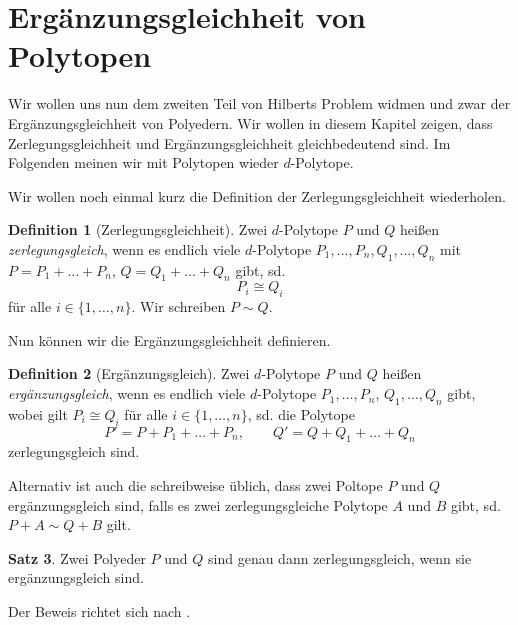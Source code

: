 \documentclass[11pt,titlepage]{article}
\theoremstyle{definition}
\newtheorem{theorem}{Satz}[section]
\newtheorem{definition}[theorem]{Definition}
\theoremstyle{remark}
\begin{document}
	\section{Ergänzungsgleichheit von Polytopen}
	
	Wir wollen uns nun dem zweiten Teil von Hilberts Problem widmen und zwar der 
	Ergänzungsgleichheit von Polyedern. Wir wollen in diesem Kapitel zeigen, dass 
	Zerlegungsgleichheit und Ergänzungsgleichheit gleichbedeutend sind. 
	Im Folgenden meinen wir mit Polytopen wieder $d$-Polytope.
	
	Wir wollen noch einmal kurz die Definition der Zerlegungsgleichheit wiederholen.
	
	\begin{definition}[Zerlegungsgleichheit]
		Zwei $d$-Polytope $P$ und $Q$ heißen \textsl{zerlegungsgleich}, wenn es endlich viele $d$-Polytope 
		$P_1,\ldots,P_n,Q_1,\ldots,Q_n$ mit $P=P_1 +\ldots +P_n$,  $Q=Q_1 +\ldots+Q_n$ 
		gibt, sd. 
		\[P_i\cong Q_i\]
		für alle $i\in\{1,\ldots,n\}$. Wir schreiben $P\sim Q$.
	\end{definition}
	
	Nun können wir die Ergänzungsgleichheit definieren.
	
	\begin{definition}[Ergänzungsgleich]
		Zwei $d$-Polytope $P$ und $Q$ heißen \textsl{ergänzungsgleich}, wenn es endlich viele $d$-Polytope 
		$P_1,\ldots,P_n$, $Q_1,\ldots,Q_n$ gibt, wobei gilt $P_i\cong Q_i$ für alle $i\in\{1,\ldots,n\}$, sd. die Polytope
		\[P'=P+P_1+\ldots+P_n,\qquad Q'=Q+Q_1+\ldots+Q_n\]
		zerlegungsgleich sind.
	\end{definition}
	
	Alternativ ist auch die schreibweise üblich, dass zwei Poltope $P$ und $Q$
	ergänzungsgleich sind, falls es zwei zerlegungsgleiche Polytope 
	$A$ und $B$ gibt, sd. $P+A\sim Q+B$ gilt. 
	
	
	\begin{theorem}
		Zwei Polyeder $P$ und $Q$ sind genau dann zerlegungsgleich, wenn sie 
		ergänzungsgleich sind.
	\end{theorem}
	
	Der Beweis richtet sich nach \cite[Satz III]{Hadwiger}.
	
\end{document}
